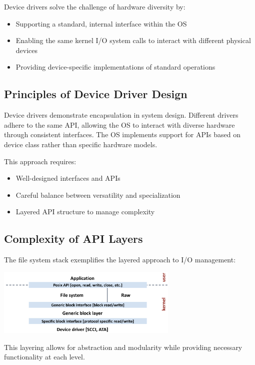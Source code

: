 \documentclass[../../compsys.tex]{subfiles}
\begin{document}
Device drivers solve the challenge of hardware diversity by:
\begin{itemize}
    \item Supporting a standard, internal interface within the OS
    \item Enabling the same kernel I/O system calls to interact with different physical devices
    \item Providing device-specific implementations of standard operations
\end{itemize}

\subsection{Principles of Device Driver Design}

Device drivers demonstrate encapsulation in system design. Different drivers adhere to the same API, allowing the OS to interact with diverse hardware through consistent interfaces. The OS implements support for APIs based on device class rather than specific hardware models.

This approach requires:
\begin{itemize}
    \item Well-designed interfaces and APIs
    \item Careful balance between versatility and specialization
    \item Layered API structure to manage complexity
\end{itemize}

\subsection{Complexity of API Layers}

The file system stack exemplifies the layered approach to I/O management:

\begin{center}
    \includegraphics[width=0.65\textwidth]{chapters/L8/images/fs-api.png}
\end{center}

This layering allows for abstraction and modularity while providing necessary functionality at each level.
\end{document}
